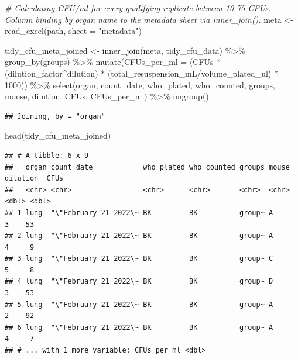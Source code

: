 \documentclass[
]{book}
\newenvironment{Shaded}{\begin{snugshade}}{\end{snugshade}}
\newcommand{\AttributeTok}[1]{\textcolor[rgb]{0.77,0.63,0.00}{#1}}
\newcommand{\CommentTok}[1]{\textcolor[rgb]{0.56,0.35,0.01}{\textit{#1}}}
\newcommand{\DecValTok}[1]{\textcolor[rgb]{0.00,0.00,0.81}{#1}}
\newcommand{\FunctionTok}[1]{\textcolor[rgb]{0.00,0.00,0.00}{#1}}
\newcommand{\NormalTok}[1]{#1}
\newcommand{\OtherTok}[1]{\textcolor[rgb]{0.56,0.35,0.01}{#1}}
\newcommand{\SpecialCharTok}[1]{\textcolor[rgb]{0.00,0.00,0.00}{#1}}
\newcommand{\StringTok}[1]{\textcolor[rgb]{0.31,0.60,0.02}{#1}}
\begin{document}
\begin{Shaded}
\begin{Highlighting}[]
\CommentTok{\# Calculating CFU/ml for every qualifying replicate between 10{-}75 CFUs. Column binding by organ name to the metadata sheet via inner\_join().}
\NormalTok{meta }\OtherTok{\textless{}{-}} \FunctionTok{read\_excel}\NormalTok{(path, }\AttributeTok{sheet =} \StringTok{"metadata"}\NormalTok{)}

\NormalTok{tidy\_cfu\_meta\_joined }\OtherTok{\textless{}{-}} \FunctionTok{inner\_join}\NormalTok{(meta, tidy\_cfu\_data) }\SpecialCharTok{\%\textgreater{}\%}
  \FunctionTok{group\_by}\NormalTok{(groups) }\SpecialCharTok{\%\textgreater{}\%} 
  \FunctionTok{mutate}\NormalTok{(}\AttributeTok{CFUs\_per\_ml =}\NormalTok{ (CFUs }\SpecialCharTok{*}\NormalTok{ (dilution\_factor}\SpecialCharTok{\^{}}\NormalTok{dilution) }\SpecialCharTok{*} 
\NormalTok{                          (total\_resuspension\_mL}\SpecialCharTok{/}\NormalTok{volume\_plated\_ul) }\SpecialCharTok{*} \DecValTok{1000}\NormalTok{)) }\SpecialCharTok{\%\textgreater{}\%}
  \FunctionTok{select}\NormalTok{(organ, count\_date, who\_plated, who\_counted, groups,  mouse, dilution,  }
\NormalTok{         CFUs, CFUs\_per\_ml) }\SpecialCharTok{\%\textgreater{}\%} 
  \FunctionTok{ungroup}\NormalTok{()}
\end{Highlighting}
\end{Shaded}

\begin{verbatim}
## Joining, by = "organ"
\end{verbatim}

\begin{Shaded}
\begin{Highlighting}[]
\FunctionTok{head}\NormalTok{(tidy\_cfu\_meta\_joined)}
\end{Highlighting}
\end{Shaded}

\begin{verbatim}
## # A tibble: 6 x 9
##   organ count_date            who_plated who_counted groups mouse dilution  CFUs
##   <chr> <chr>                 <chr>      <chr>       <chr>  <chr>    <dbl> <dbl>
## 1 lung  "\"February 21 2022\~ BK         BK          group~ A            3    53
## 2 lung  "\"February 21 2022\~ BK         BK          group~ A            4     9
## 3 lung  "\"February 21 2022\~ BK         BK          group~ C            5     8
## 4 lung  "\"February 21 2022\~ BK         BK          group~ D            3    53
## 5 lung  "\"February 21 2022\~ BK         BK          group~ A            2    92
## 6 lung  "\"February 21 2022\~ BK         BK          group~ A            4     7
## # ... with 1 more variable: CFUs_per_ml <dbl>
\end{verbatim}
\end{document}
